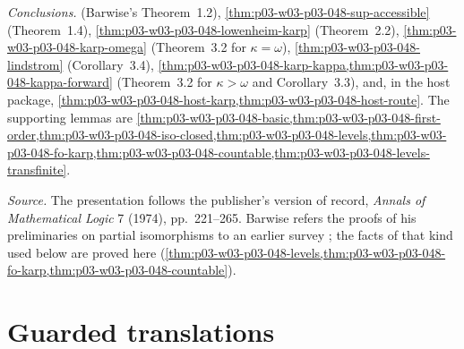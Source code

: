 \emph{Conclusions.}
 (Barwise's Theorem~1.2),
\cref{thm:p03-w03-p03-048-sup-accessible} (Theorem~1.4),
\cref{thm:p03-w03-p03-048-lowenheim-karp} (Theorem~2.2),
\cref{thm:p03-w03-p03-048-karp-omega} (Theorem~3.2 for \(\kappa=\omega\)),
\cref{thm:p03-w03-p03-048-lindstrom} (Corollary~3.4),
\cref{thm:p03-w03-p03-048-karp-kappa,thm:p03-w03-p03-048-kappa-forward}
(Theorem~3.2 for \(\kappa>\omega\) and Corollary~3.3), and, in the host
package, \cref{thm:p03-w03-p03-048-host-karp,thm:p03-w03-p03-048-host-route}.
The supporting lemmas are
\cref{thm:p03-w03-p03-048-basic,thm:p03-w03-p03-048-first-order,thm:p03-w03-p03-048-iso-closed,thm:p03-w03-p03-048-levels,thm:p03-w03-p03-048-fo-karp,thm:p03-w03-p03-048-countable,thm:p03-w03-p03-048-levels-transfinite}.

\emph{Source.}  The presentation follows the publisher's version of record,
\emph{Annals of Mathematical Logic} 7 (1974), pp.~221--265.  Barwise refers
the proofs of his preliminaries on partial isomorphisms to an earlier survey
\cite[Part~I, \S10, p.~243]{Barwise1974Axioms}; the facts of that kind used
below are proved here
(\cref{thm:p03-w03-p03-048-levels,thm:p03-w03-p03-048-fo-karp,thm:p03-w03-p03-048-countable}).

\section{Guarded translations}
\label{sec:p03-w03-p03-048-standing}


